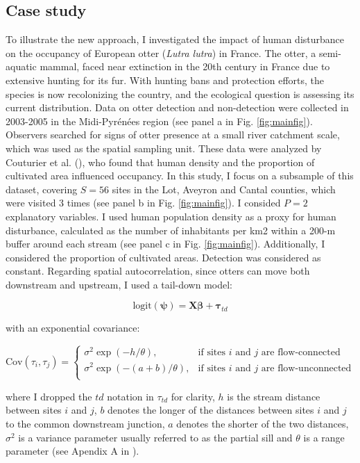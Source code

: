 \documentclass[
  11pt,
  a4paper,
]{article}
\begin{document}
\subsection{Case study}\label{case-study}

To illustrate the new approach, I investigated the impact of human disturbance on the occupancy of European otter (\emph{Lutra lutra}) in France. The otter, a semi-aquatic mammal, faced near extinction in the 20th century in France due to extensive hunting for its fur. With hunting bans and protection efforts, the species is now recolonizing the country, and the ecological question is assessing its current distribution. Data on otter detection and non-detection were collected in 2003-2005 in the Midi-Pyrénées region (see panel a in Fig. \ref{fig:mainfig}). Observers searched for signs of otter presence at a small river catchment scale, which was used as the spatial sampling unit. These data were analyzed by Couturier et al. (), who found that human density and the proportion of cultivated area influenced occupancy. In this study, I focus on a subsample of this dataset, covering \(S = 56\) sites in the Lot, Aveyron and Cantal counties, which were visited 3 times (see panel b in Fig. \ref{fig:mainfig}). I consided \(P = 2\) explanatory variables. I used human population density as a proxy for human disturbance, calculated as the number of inhabitants per km2 within a 200-m buffer around each stream (see panel c in Fig. \ref{fig:mainfig}). Additionally, I considered the proportion of cultivated areas. Detection was considered as constant. Regarding spatial autocorrelation, since otters can move both downstream and upstream, I used a tail-down model:

\begin{equation}
\text{logit}(\boldsymbol{\psi}) = \mathbf{X} \boldsymbol{\beta} +\boldsymbol{\tau}_{td}
\end{equation}

with an exponential covariance:

\[
    \text{Cov}(\tau_{i},\tau_{j})=
\begin{cases}
    \displaystyle{\sigma^2\exp(-h/\theta)},& \text{if sites } i \text{ and } j \text{ are flow-connected }\\
    \displaystyle{\sigma^2\exp(-(a+b)/\theta)},& \text{if sites } i \text{ and } j \text{ are flow-unconnected }\\
\end{cases}
\]

where I dropped the \(td\) notation in \(\tau_{td}\) for clarity, \(h\) is the stream distance between sites \(i\) and \(j\), \(b\) denotes the longer of the distances between sites \(i\) and \(j\) to the common downstream junction, \(a\) denotes the shorter of the two distances, \(\sigma^2\) is a variance parameter usually referred to as the partial sill and \(\theta\) is a range parameter (see Apendix A in ).
\end{document}
